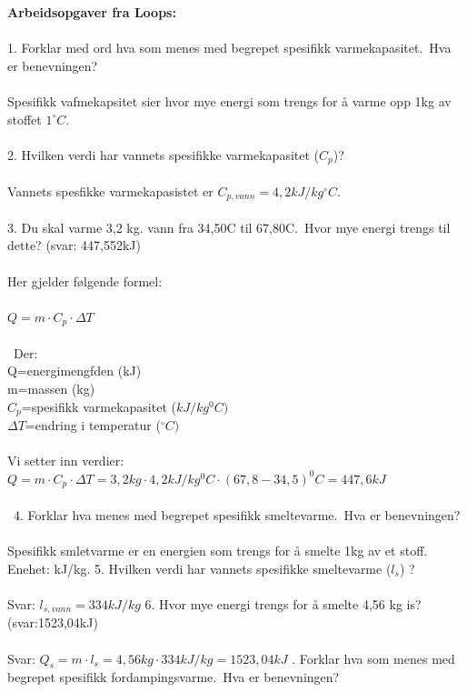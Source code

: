 \documentclass{minmal}
\begin{document}
\textbf{Arbeidsopgaver fra Loops:}\\\\
1. Forklar med ord hva som menes med begrepet spesifikk varmekapasitet. Hva er benevningen? \\\\ Spesifikk vafmekapsitet sier hvor mye energi som trengs for å varme opp 1kg av stoffet $1^\circ C$.  \\\\
2. Hvilken verdi har vannets spesifikke varmekapasitet ($C_p$)?  \\\\ Vannets spesfikke varmekapasistet er $C_{p,vann}=4,2kJ/kg^\circ C$.\\\\
3. Du skal varme 3,2 kg. vann fra 34,50C til 67,80C. Hvor mye energi trengs til dette? (svar: 447,552kJ)\\\\
Her gjelder følgende formel:\\\\
$Q=m\cdot C_p\cdot \Delta T$\\\\\
Der:\\
Q=energimengfden (kJ)\\
m=massen (kg)\\
$C_p$=spesifikk varmekapasitet ($kJ/kg^0 C)$\\
$\Delta T$=endring i temperatur ($^\circ C)$\\\\
Vi setter inn verdier:\\
$Q=m\cdot C_p\cdot \Delta T=3,2kg\cdot 4,2kJ/kg^0C\cdot (67,8-34,5)^0C=447,6kJ$
\\\\\
4. Forklar hva menes med begrepet spesifikk smeltevarme. Hva er benevningen? \\\\
Spesifikk smletvarme er en energien som trengs for å smelte 1kg av et stoff.  Enehet: kJ/kg.
5.  Hvilken verdi har vannets spesifikke smeltevarme ($l_s$) ? \\\\
Svar:  $l_{s,vann}=334kJ/kg$
6.  Hvor mye energi trengs for å smelte 4,56 kg is? (svar:1523,04kJ) \\\\
Svar: $Q_s=m\cdot l_s=4,56kg\cdot 334kJ/kg=1523,04kJ$
\newpage\noindent
7.  Forklar hva som menes med begrepet spesifikk fordampingsvarme. Hva er benevningen? \\\\
\end{document}
